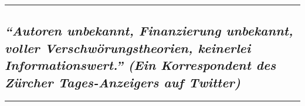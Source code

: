 \begin{center}\rule{0.5\linewidth}{\linethickness}\end{center}

\hypertarget{autoren-unbekannt-finanzierung-unbekannt-voller-verschwuxf6rungstheorien-keinerlei-informationswert-ein-korrespondent-des-zuxfcrcher-tages-anzeigers-auf-twitter}{%
\subsection{\texorpdfstring{\emph{``Autoren unbekannt, Finanzierung
unbekannt, voller Verschwörungstheorien, keinerlei Informa­tions­wert.''
(Ein Korrespondent des Zürcher Tages-Anzeigers auf
Twitter)}}{``Autoren unbekannt, Finanzierung unbekannt, voller Verschwörungstheorien, keinerlei Informa­tions­wert.'' (Ein Korrespondent des Zürcher Tages-Anzeigers auf Twitter)}}\label{autoren-unbekannt-finanzierung-unbekannt-voller-verschwuxf6rungstheorien-keinerlei-informationswert-ein-korrespondent-des-zuxfcrcher-tages-anzeigers-auf-twitter}}

\begin{center}\rule{0.5\linewidth}{\linethickness}\end{center}

